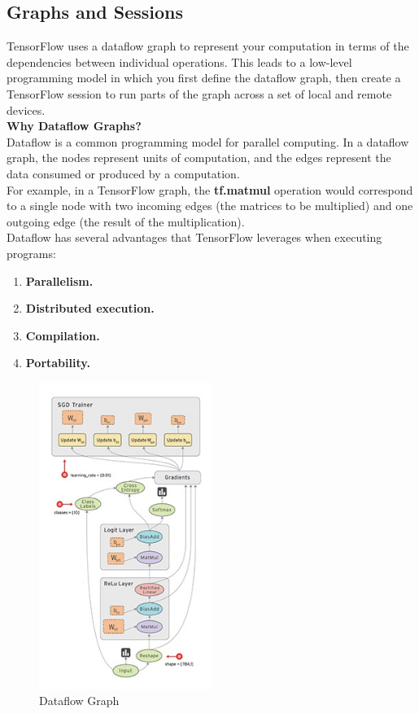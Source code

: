 \subsection{Graphs and Sessions}
TensorFlow uses a dataflow graph to represent your computation in terms of the dependencies between individual operations. This leads to a low-level programming model in which you first define the dataflow graph, then create a TensorFlow session to run parts of the graph across a set of local and remote devices.\\
  \textbf{Why Dataflow Graphs?}\\
  Dataflow is a common programming model for parallel computing. In a dataflow graph, the nodes represent units of computation, and the edges represent the data consumed or produced by a computation.\\
  For example, in a TensorFlow graph, the \textbf{tf.matmul} operation would correspond to a single node with two incoming edges (the matrices to be multiplied) and one outgoing edge (the result of the multiplication).\\
Dataflow has several advantages that TensorFlow leverages when executing programs:
\begin{enumerate}
      \item\textbf{Parallelism.}
\item\textbf{Distributed execution.}
\item\textbf{Compilation.}
\item\textbf{Portability.}
\end{enumerate}
\begin{figure}[H]%
    \center%
    \includegraphics[width=0.5\textwidth]{images/eman/Dataflow-graph.jpg}%
\caption [Dataflow Graph]{Dataflow Graph}\label{fig:graph}%
  \end{figure}

